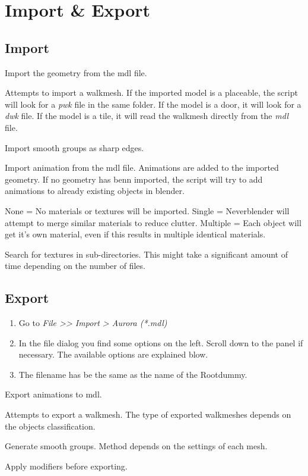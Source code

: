 \chapter{Import \& Export}

\section{Import}

\begin{description}[leftmargin=13em,style=nextline]
    \item[Import Geometry] Import the geometry from the mdl file.
    \item[Import Walkmesh] Attempts to import a walkmesh. If the imported model is a placeable, the script will look for a {\textit{pwk}} file in the same folder. If the model is a door, it will look for a {\textit{dwk}} file. If the model is a tile, it will read the walkmesh directly from the {\textit{mdl}} file.
    \item[Import Smooth Groups] Import smooth groups as sharp edges.
    \item[Import Animations] Import animation from the mdl file. Animations are added to the imported geometry. If no geometry has benn imported, the script will try to add animations to already existing objects in blender.
    \item[Materials] None = No materials or textures will be imported. Single = Neverblender will attempt to merge similar materials to reduce clutter. Multiple = Each object will get it's own material, even if this results in multiple identical materials.
    \item[Image Search] Search for textures in sub-directories. This might take a significant amount of time depending on the number of files.
\end{description}

\section{Export}
\begin{enumerate}
	\item Go to \textit{File >> Import > Aurora (*.mdl)}
	\item In the file dialog you find some options on the left. Scroll down to the panel if necessary. The available options are explained blow.
	\item The filename has be the same as the name of the Rootdummy.
\end{enumerate}

\begin{description}[leftmargin=12em,style=nextline]
    \item[Export Animations] Export animations to mdl.
    \item[Export Walkmesh] Attempts to export a walkmesh. The type of exported walkmeshes depends on the objects classification.
    \item[Export Smooth Groups] Generate smooth groups. Method depends on the settings of each mesh.
    \item[Apply Modifiers] Apply modifiers before exporting.
\end{description}
